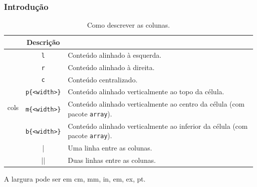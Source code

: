 \documentclass[brazilian]{beamer}
\begin{document}
\begin{frame}[fragile]
  \frametitle{Introdução}
  \footnotesize

  \begin{table}
    \caption{Como descrever as colunas.}
    \label{tab:Colunas}
    \begin{tabular}[c]{c|c|m{8cm}}
      \firsthline
      \multicolumn{2}{c}{Comando} & Descrição                                                                                                  \\ \hline
      \multirow{9}{*}{cols}       & \texttt{l}            & Conteúdo alinhado à esquerda.                                                      \\ \cline{2-3}
                                  & \texttt{r}            & Conteúdo alinhado à direita.                                                       \\ \cline{2-3}
                                  & \texttt{c}            & Conteúdo centralizado.                                                             \\ \cline{2-3}
                                  & \texttt{p\{<width>\}} & Conteúdo alinhado verticalmente ao topo da célula.                                 \\ \cline{2-3}
                                  & \texttt{m\{<width>\}} & Conteúdo alinhado verticalmente ao centro da célula (com pacote \texttt{array}).   \\ \cline{2-3}
                                  & \texttt{b\{<width>\}} & Conteúdo alinhado verticalmente ao inferior da célula (com pacote \texttt{array}). \\ \cline{2-3}
                                  & |                     & Uma linha entre as colunas.                                                        \\ \cline{2-3}
                                  & ||                    & Duas linhas entre as colunas.                                                      \\ \hline
    \end{tabular}
  \end{table}


  A largura pode ser em cm, mm, in, em, ex, pt.
\end{frame}
\end{document}
